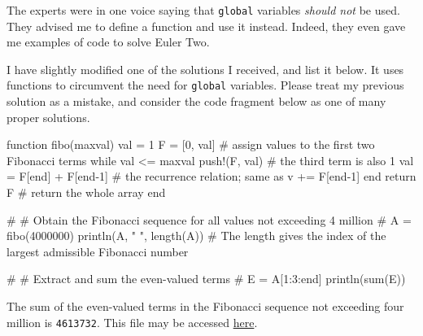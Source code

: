 \documentclass[
  a4paper,
]{article}
\newenvironment{Shaded}{\begin{snugshade}}{\end{snugshade}}
\newcommand{\CommentTok}[1]{\textcolor[rgb]{0.50,0.62,0.50}{#1}}
\newcommand{\ControlFlowTok}[1]{\textcolor[rgb]{0.94,0.87,0.69}{#1}}
\newcommand{\FloatTok}[1]{\textcolor[rgb]{0.75,0.75,0.82}{#1}}
\newcommand{\FunctionTok}[1]{\textcolor[rgb]{0.94,0.94,0.56}{#1}}
\newcommand{\KeywordTok}[1]{\textcolor[rgb]{0.94,0.87,0.69}{#1}}
\newcommand{\NormalTok}[1]{\textcolor[rgb]{0.80,0.80,0.80}{#1}}
\newcommand{\OperatorTok}[1]{\textcolor[rgb]{0.94,0.94,0.82}{#1}}
\newcommand{\StringTok}[1]{\textcolor[rgb]{0.80,0.58,0.58}{#1}}
\begin{document}
The experts were in one voice saying that \texttt{global} variables
\emph{should not} be used. They advised me to define a function and use
it instead. Indeed, they even gave me examples of code to solve Euler
Two.

I have slightly modified one of the solutions I received, and list it
below. It uses functions to circumvent the need for \texttt{global}
variables. Please treat my previous solution as a mistake, and consider
the code fragment below as one of many proper solutions.

\begin{Shaded}
\begin{Highlighting}[]
\KeywordTok{function} \FunctionTok{fibo}\NormalTok{(maxval)}
\NormalTok{    val }\OperatorTok{=} \FloatTok{1}
\NormalTok{    F }\OperatorTok{=}\NormalTok{ [}\FloatTok{0}\NormalTok{, val] }\CommentTok{\# assign values to the first two Fibonacci terms}
    \ControlFlowTok{while}\NormalTok{ val }\OperatorTok{\textless{}=}\NormalTok{ maxval}
        \FunctionTok{push!}\NormalTok{(F, val) }\CommentTok{\# the third term is also 1}
\NormalTok{        val }\OperatorTok{=}\NormalTok{ F[}\KeywordTok{end}\NormalTok{] }\OperatorTok{+}\NormalTok{ F[}\KeywordTok{end}\OperatorTok{{-}}\FloatTok{1}\NormalTok{] }\CommentTok{\# the recurrence relation; same as v += F[end{-}1]}
    \ControlFlowTok{end}
    \ControlFlowTok{return}\NormalTok{ F }\CommentTok{\# return the whole array}
\KeywordTok{end}

\CommentTok{\#}
\CommentTok{\# Obtain the Fibonacci sequence for all values not exceeding 4 million}
\CommentTok{\#}
\NormalTok{A }\OperatorTok{=} \FunctionTok{fibo}\NormalTok{(}\FloatTok{4000000}\NormalTok{)}
\FunctionTok{println}\NormalTok{(A, }\StringTok{" "}\NormalTok{, }\FunctionTok{length}\NormalTok{(A)) }\CommentTok{\# The length gives the index of the largest admissible Fibonacci number}

\CommentTok{\#}
\CommentTok{\# Extract and sum the even{-}valued terms}
\CommentTok{\#}
\NormalTok{E }\OperatorTok{=}\NormalTok{ A[}\FloatTok{1}\OperatorTok{:}\FloatTok{3}\OperatorTok{:}\KeywordTok{end}\NormalTok{]}
\FunctionTok{println}\NormalTok{(}\FunctionTok{sum}\NormalTok{(E))}
\end{Highlighting}
\end{Shaded}

The sum of the even-valued terms in the Fibonacci sequence not exceeding
four million is \texttt{4613732}. This file may be accessed
\href{auxiliary/better-even-sum.jl}{here}.
\end{document}
